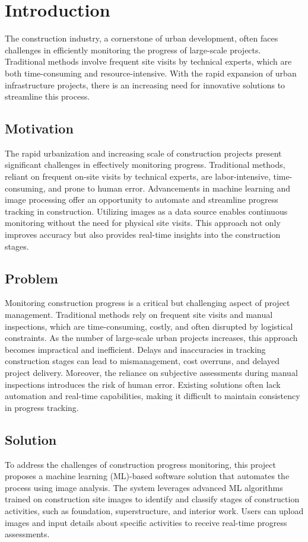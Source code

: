 \chapter{Introduction}
\label{chap:introduction-unique}

The construction industry, a cornerstone of urban development, often faces challenges in efficiently monitoring the progress of large-scale projects. Traditional methods involve frequent site visits by technical experts, which are both time-consuming and resource-intensive. With the rapid expansion of urban infrastructure projects, there is an increasing need for innovative solutions to streamline this process.

\section{Motivation}
\label{sec:motivation-unique}
The rapid urbanization and increasing scale of construction projects present significant challenges in effectively monitoring progress. Traditional methods, reliant on frequent on-site visits by technical experts, are labor-intensive, time-consuming, and prone to human error. Advancements in machine learning and image processing offer an opportunity to automate and streamline progress tracking in construction. Utilizing images as a data source enables continuous monitoring without the need for physical site visits. This approach not only improves accuracy but also provides real-time insights into the construction stages.

\section{Problem}
\label{sec:problem-unique}
Monitoring construction progress is a critical but challenging aspect of project management. Traditional methods rely on frequent site visits and manual inspections, which are time-consuming, costly, and often disrupted by logistical constraints. As the number of large-scale urban projects increases, this approach becomes impractical and inefficient. Delays and inaccuracies in tracking construction stages can lead to mismanagement, cost overruns, and delayed project delivery. Moreover, the reliance on subjective assessments during manual inspections introduces the risk of human error. Existing solutions often lack automation and real-time capabilities, making it difficult to maintain consistency in progress tracking.

\section{Solution}
\label{sec:solution-unique}
To address the challenges of construction progress monitoring, this project proposes a machine learning (ML)-based software solution that automates the process using image analysis. The system leverages advanced ML algorithms trained on construction site images to identify and classify stages of construction activities, such as foundation, superstructure, and interior work. Users can upload images and input details about specific activities to receive real-time progress assessments.
